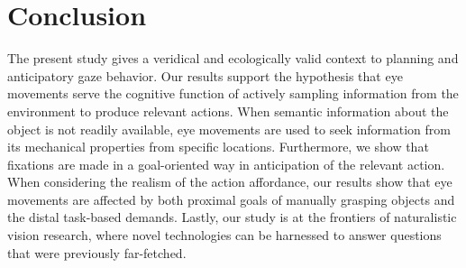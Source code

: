 \section{Conclusion}

The present study gives a veridical and ecologically valid context to planning and anticipatory gaze behavior. Our results support the hypothesis that eye movements serve the cognitive function of actively sampling information from the environment to produce relevant actions. When semantic information about the object is not readily available, eye movements are used to seek information from its mechanical properties from specific locations. Furthermore, we show that fixations are made in a goal-oriented way in anticipation of the relevant action. When considering the realism of the action affordance, our results show that eye movements are affected by both proximal goals of manually grasping objects and the distal task-based demands. Lastly, our study is at the frontiers of naturalistic vision research, where novel technologies can be harnessed to answer questions that were previously far-fetched.


